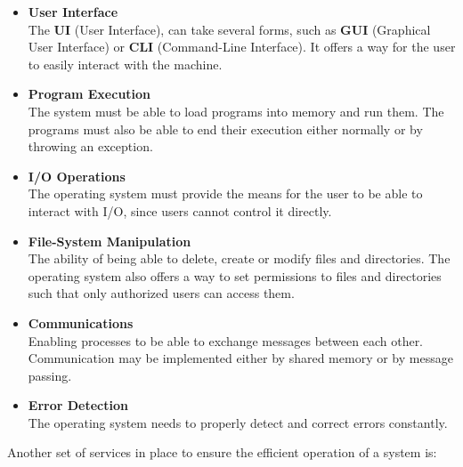 \documentclass{article}
\begin{document}
\begin{itemize}
	\item \textbf{User Interface}
	\vspace{.2cm} \\
	The \textbf{UI} (User Interface), can take several forms, such as \textbf{GUI} (Graphical User Interface) or \textbf{CLI} (Command-Line Interface). It offers a way for the user to easily interact with the machine.
	
	\item \textbf{Program Execution}
	\vspace{.2cm} \\
	The system must be able to load programs into memory and run them. The programs must also be able to end their execution either normally or by throwing an exception.
	
	\item \textbf{I/O Operations}
	\vspace{.2cm} \\
	The operating system must provide the means for the user to be able to interact with I/O, since users cannot control it directly.
	
	\item \textbf{File-System Manipulation}
	\vspace{.2cm} \\
	The ability of being able to delete, create or modify files and directories. The operating system also offers a way to set permissions to files and directories such that only authorized users can access them.
	
	\item \textbf{Communications}
	\vspace{.2cm} \\
	Enabling processes to be able to exchange messages between each other. Communication may be implemented either by shared memory or by message passing.
	
	\item \textbf{Error Detection}
	\vspace{.2cm} \\
	The operating system needs to properly detect and correct errors constantly.
\end{itemize}
Another set of services in place to ensure the efficient operation of a system is:
\end{document}
